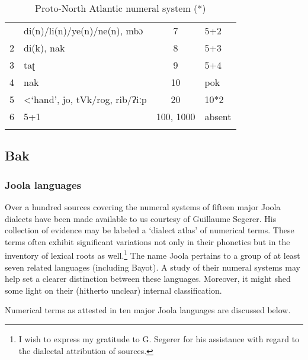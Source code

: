 \newpage 
{}
\begin{table}
\caption{\label{tab:3:233}Proto-North Atlantic numeral system (*)}
\begin{tabularx}{\textwidth}{llSX}
 & di(n)/li(n)/ye(n)/ne(n), mbɔ & 7 & 5+2\\
2 & di(k), nak & 8 & 5+3\\
3 & taʈ & 9 & 5+4\\
4 & nak & 10 & pok\\
5 & <‘hand’, jo, tVk/rog, rib/ʔiːp & 20 & 10*2\\
6 & 5+1 & 100, 1000 & absent\\
\lspbottomrule
\end{tabularx}
\end{table}

 
\subsection{Bak}%
\subsubsection{Joola languages}%
Over a hundred sources covering the numeral systems of fifteen major Joola dialects have been made available to us courtesy of Guillaume Segerer. His collection of evidence may be labeled a ‘dialect atlas’ of numerical terms. These terms often exhibit significant variations not only in their phonetics but in the inventory of lexical roots as well.\footnote{I wish to express my gratitude to G. Segerer for his assistance with regard to the dialectal attribution of sources.}  The name Joola pertains to a group of at least seven related languages (including Bayot). A study of their numeral systems may help set a clearer distinction between these languages. Moreover, it might shed some light on their (hitherto unclear) internal classification.

Numerical terms as attested in ten major Joola languages are discussed below.


